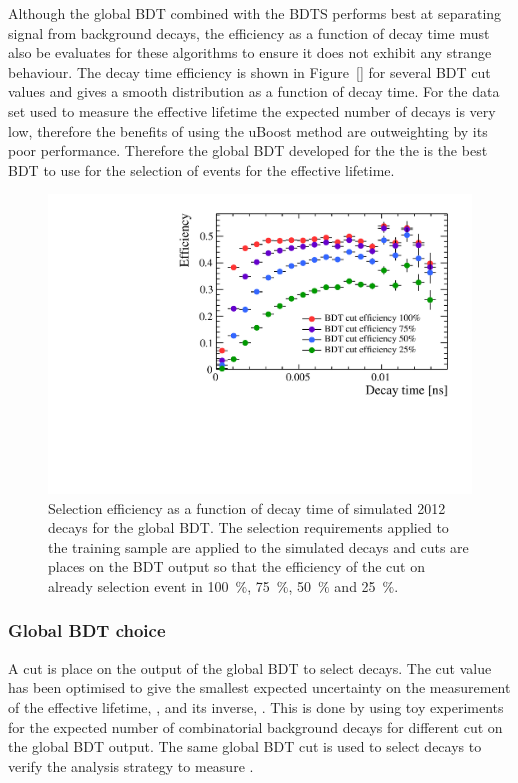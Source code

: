 Although the global BDT combined with the BDTS performs best at separating signal from background decays, the efficiency as a function of decay time must also be evaluates for these algorithms to ensure it does not exhibit any strange behaviour. The decay time efficiency is shown in Figure~\ref{} for several BDT cut values and gives a smooth distribution as a function of decay time. For the data set used to measure the \bsmumu effective lifetime the expected number of \bsmumu decays is very low, therefore the benefits of using the uBoost method are outweighting by its poor performance. Therefore the global BDT developed for the the \BF is the best BDT to use for the selection of events for the \bsmumu effective lifetime. 
\begin{figure}[htbp]
    \centering
        \includegraphics[width=0.49 \textwidth]{./Figs/Selection/BDT1_acceptances.pdf}
    \caption{Selection efficiency as a function of decay time of simulated 2012 \bsmumu decays for the global BDT. The selection requirements applied to the training sample are applied to the simulated decays and cuts are places on the BDT output so that the efficiency of the cut on already selection event in 100~$\%$, 75~$\%$, 50~$\%$ and 25~$\%$. }
    \label{fig:accptsBFBDTs}
\end{figure}

\subsubsection{Global BDT choice}
\label{sec:globalBDToptimisation}

A cut is place on the output of the global BDT to select \bsmumu decays. The cut value has been optimised to give the smallest expected uncertainty on the measurement of the \bsmumu effective lifetime, \tmumu, and its inverse, \invtmumu. This is done by using toy experiments for the expected number of \bsmumu combinatorial background decays for different cut on the global BDT output. The same global BDT cut is used to select \bhh decays to verify the analysis strategy to measure \tmumu.

